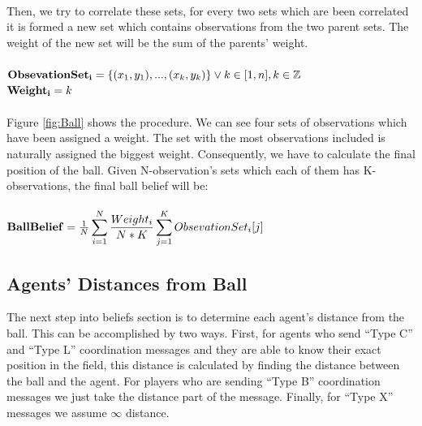 \\
Then, we try to correlate these sets, for every two sets which are been correlated it is formed a new set which contains observations from the two parent sets. The weight of the new set will be the sum of the parents' weight.\\
\\
${\bf Obsevation Set_{i} } = \lbrace (x_{1},y_{1}),...,(x_{k},y_{k}) \rbrace \vee k \in [1,n] , k\in \mathbb{Z}$\\
${\bf Weight_{i}} = k$\\
\\
Figure \ref{fig:Ball} shows the procedure. We can see four sets of observations which have been assigned a weight. The set with the most observations included is naturally assigned the biggest weight. Consequently, we have to calculate the final position of the ball.
Given N-observation's sets which each of them has K-observations, the final ball belief will be:\\
\\
${\bf Ball Belief} = \frac {1} {N} \displaystyle\sum\limits_{i=1}^N \frac {Weight_{i}} {N \ast K}  \displaystyle\sum\limits_{j=1}^K Obsevation Set_{i}[j]$
\subsection{Agents' Distances from Ball}
The next step into beliefs section is to determine each agent's distance from the ball. This can be accomplished by two ways. First, for agents who send ``Type C'' and ``Type L'' coordination messages and they are able to know their exact position in the field, this distance is calculated by finding the distance between the ball and the agent. For players who are sending ``Type B'' coordination messages we just take the distance part of the message. Finally, for ``Type X'' messages we assume $\infty$ distance.

